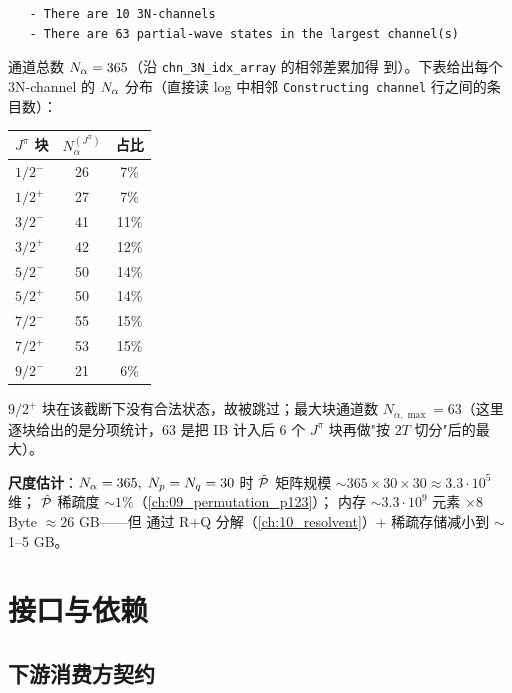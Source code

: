 \begin{numericalbox}[label={box:ch07-numerical-closure}]
\begin{verbatim}
   - There are 10 3N-channels
   - There are 63 partial-wave states in the largest channel(s)
\end{verbatim}

通道总数 \(N_\alpha = 365\)（沿 \texttt{chn\_3N\_idx\_array} 的相邻差累加得
到）。下表给出每个 3N-channel 的 \(N_\alpha\) 分布（直接读 log 中相邻
\texttt{Constructing channel} 行之间的条目数）：

\begin{center}
\begin{tabular}{lcc}
\toprule
\(J^\pi\) 块 & \(N_\alpha^{(J^\pi)}\) & 占比 \\
\midrule
\(1/2^-\) & 26 & 7\% \\
\(1/2^+\) & 27 & 7\% \\
\(3/2^-\) & 41 & 11\% \\
\(3/2^+\) & 42 & 12\% \\
\(5/2^-\) & 50 & 14\% \\
\(5/2^+\) & 50 & 14\% \\
\(7/2^-\) & 55 & 15\% \\
\(7/2^+\) & 53 & 15\% \\
\(9/2^-\) & 21 & 6\% \\
\bottomrule
\end{tabular}
\end{center}

\(9/2^+\) 块在该截断下没有合法状态，故被跳过；最大块通道数
\(N_{\alpha,\max} = 63\)（这里逐块给出的是分项统计，63 是把 IB 计入后 6 个
\(J^\pi\) 块再做"按 \(2T\) 切分"后的最大）。

\textbf{尺度估计}：\(N_\alpha = 365,\;N_p = N_q = 30\) 时
\(\hat{\mathcal{P}}\) 矩阵规模 \(\sim 365 \times 30 \times 30 \approx 3.3 \cdot 10^5\) 维；
\(\hat{\mathcal{P}}\) 稀疏度 \(\sim 1\%\)（\cref{ch:09_permutation_p123}）；
内存 \(\sim 3.3 \cdot 10^9\) 元素 \(\times 8\) Byte \(\approx 26\) GB——但
通过 R+Q 分解（\cref{ch:10_resolvent}）+ 稀疏存储减小到 \(\sim\)1--5 GB。

\end{numericalbox}

\section{接口与依赖}
\label{sec:ch07-interface}

\subsection{下游消费方契约}
\label{subsec:ch07-downstream}

